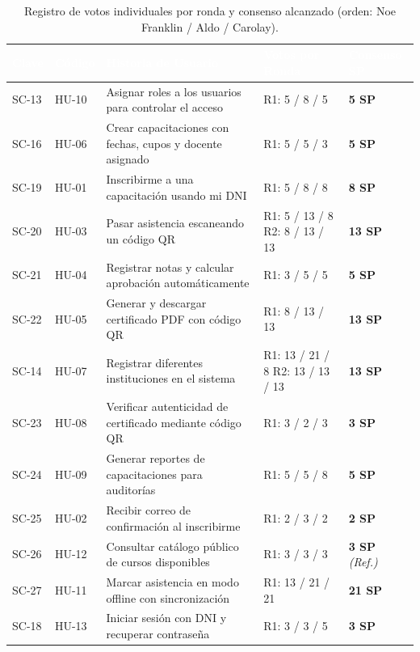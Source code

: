 \begin{table}[H]
\centering
\small
\renewcommand{\arraystretch}{1.2}
\caption{Registro de votos individuales por ronda y consenso alcanzado (orden: Noe Franklin / Aldo / Carolay).}
\label{tab:votos_sesion}
\begin{tabularx}{\textwidth}{P{1.4cm} P{1.4cm} Y P{3.2cm} C{1.8cm}}
\toprule
{}
\textcolor{white}{\textbf{Clave}} & \textcolor{white}{\textbf{Código}} & \textcolor{white}{\textbf{Historia de Usuario}} & \textcolor{white}{\textbf{Votos por Ronda}} & \textcolor{white}{\textbf{Consenso SP}} \\
\midrule
{}
SC-13 & HU-10 & Asignar roles a los usuarios para controlar el acceso & R1: 5 / 8 / 5 & \textbf{5 SP} \\
SC-16 & HU-06 & Crear capacitaciones con fechas, cupos y docente asignado & R1: 5 / 5 / 3 & \textbf{5 SP} \\
SC-19 & HU-01 & Inscribirme a una capacitación usando mi DNI & R1: 5 / 8 / 8 & \textbf{8 SP} \\
SC-20 & HU-03 & Pasar asistencia escaneando un código QR & R1: 5 / 13 / 8 \newline R2: 8 / 13 / 13 & \textbf{13 SP} \\
SC-21 & HU-04 & Registrar notas y calcular aprobación automáticamente & R1: 3 / 5 / 5 & \textbf{5 SP} \\
SC-22 & HU-05 & Generar y descargar certificado PDF con código QR & R1: 8 / 13 / 13 & \textbf{13 SP} \\
SC-14 & HU-07 & Registrar diferentes instituciones en el sistema & R1: 13 / 21 / 8 \newline R2: 13 / 13 / 13 & \textbf{13 SP} \\
SC-23 & HU-08 & Verificar autenticidad de certificado mediante código QR & R1: 3 / 2 / 3 & \textbf{3 SP} \\
SC-24 & HU-09 & Generar reportes de capacitaciones para auditorías & R1: 5 / 5 / 8 & \textbf{5 SP} \\
SC-25 & HU-02 & Recibir correo de confirmación al inscribirme & R1: 2 / 3 / 2 & \textbf{2 SP} \\
SC-26 & HU-12 & Consultar catálogo público de cursos disponibles & R1: 3 / 3 / 3 & \textbf{3 SP} \textit{(Ref.)} \\
SC-27 & HU-11 & Marcar asistencia en modo offline con sincronización & R1: 13 / 21 / 21 & \textbf{21 SP} \\
SC-18 & HU-13 & Iniciar sesión con DNI y recuperar contraseña & R1: 3 / 3 / 5 & \textbf{3 SP} \\
\bottomrule
\end{tabularx}
\end{table}

